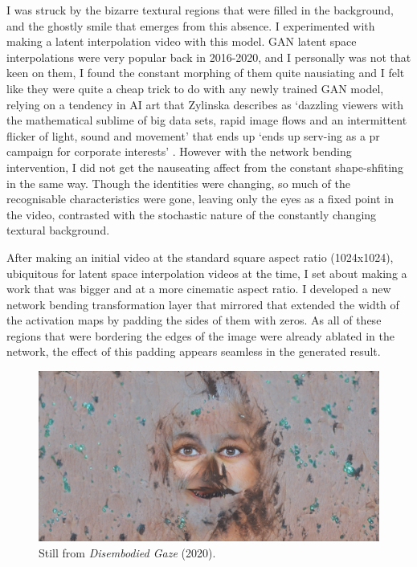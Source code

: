 I was struck by the bizarre textural regions that were filled in the background, and the ghostly smile that emerges from this absence. 
I experimented with making a latent interpolation video with this model. GAN latent space interpolations were very popular back in 2016-2020, and I personally was not that keen on them, I found the constant morphing of them quite nausiating and I felt like they were quite a cheap trick to do with any newly trained GAN model, relying on a tendency in AI art that Zylinska describes as `dazzling viewers with the mathematical sublime of big data sets, rapid image flows and an intermittent flicker of light, sound and movement' that ends up `ends up serv-ing as a pr campaign for corporate interests'  \citeyearpar{zylinska2020ai}. 
However with the network bending intervention, I did not get the nauseating affect from the constant shape-shfiting in the same way. 
Though the identities were changing, so much of the recognisable characteristics were gone, leaving only the eyes as a fixed point in the video, contrasted with the stochastic nature of the constantly changing textural background. 

After making an initial video at the standard square aspect ratio (1024x1024), ubiquitous for latent space interpolation videos at the time, I set about making a work that was bigger and at a more cinematic aspect ratio. 
I developed a new network bending transformation layer that mirrored that extended the width of the activation maps by padding the sides of them with zeros.
As all of these regions that were bordering the edges of the image were already ablated in the network, the effect of this padding appears seamless in the generated result. 

\begin{figure}[!htb]
    \centering
    \captionsetup{justification=centering}
    \includegraphics[width=1\textwidth]{figures/c7_impact/disembodied_gaze.png}
    \caption{Still from \textit{Disembodied Gaze} (2020).}
    \label{fig:c7:disembodied-gaze-wide}
\end{figure}

